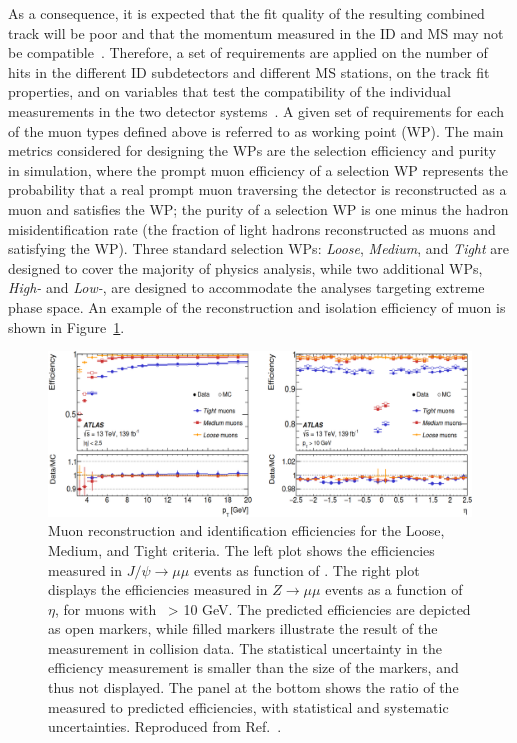 As a consequence, it is expected that the fit quality of the resulting combined track 
will be poor and that the momentum measured in the ID and MS may not be compatible~\cite{PERF-2015-10}. 
Therefore, a set of requirements are applied on the
number of hits in the different ID subdetectors and different
MS stations, on the track fit properties, 
and on variables that test the compatibility of the individual measurements 
in the two detector systems~\cite{CERN-EP-2020-199}.
A given set of requirements for each of the muon types defined above
is referred to as working point (WP).
The main metrics considered for designing the WPs are 
the selection efficiency and purity in simulation,
where the prompt muon efficiency of a selection WP 
represents the probability that a real prompt muon traversing the detector 
is reconstructed as a muon and satisfies the WP; the purity
of a selection WP is one minus the hadron misidentification
rate (the fraction of light hadrons reconstructed as muons 
and satisfying the WP).
Three standard selection WPs: \textit{Loose},
\textit{Medium}, and \textit{Tight} are designed to 
cover the majority of physics analysis, while
two additional WPs, \textit{High-\pt} and \textit{Low-\pt},
are designed to accommodate the analyses targeting extreme 
phase space. 
An example of the reconstruction and isolation efficiency of muon is 
shown in Figure~\ref{fig:muon_ID}.
\begin{figure}[bht]
    \begin{centering}	
    \includegraphics[width=1.0\textwidth]{Reconstruction/plots/muon_ID.png}
    \caption{
        Muon reconstruction and identification efficiencies for the Loose, Medium, and Tight criteria. 
        The left plot shows the efficiencies measured in $J/\psi \rightarrow \mu\mu$ events as function of \pt. 
        The right plot displays the efficiencies measured in $Z \rightarrow \mu\mu$ events as a function of $\eta$, 
        for muons with \pt\ > 10 GeV. The predicted efficiencies are depicted as open markers, 
        while filled markers illustrate the result of the measurement in collision data. 
        The statistical uncertainty in the efficiency measurement is smaller than the size of the markers, 
        and thus not displayed. The panel at the bottom shows the ratio of the measured to predicted efficiencies, 
        with statistical and systematic uncertainties.
        Reproduced from Ref.~\cite{CERN-EP-2020-199}.}
    \label{fig:muon_ID}
    \end{centering}
\end{figure}

